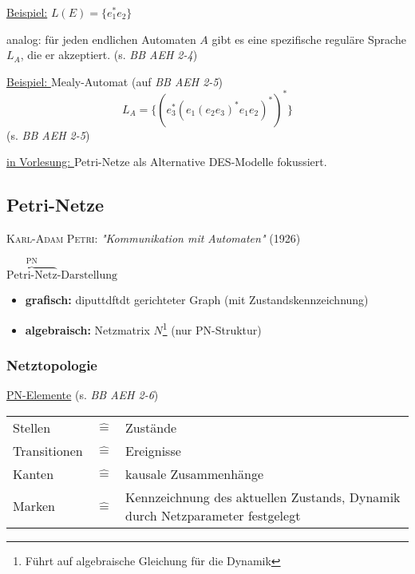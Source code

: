 \underline{Beispiel:} $L(E) = \{e_1^{\ast} e_2\}$


analog: für jeden endlichen Automaten $A$ gibt es eine spezifische reguläre Sprache $L_A$, die er akzeptiert. (s. \textit{BB AEH 2-4})

\underline{Beispiel: } Mealy-Automat (auf \textit{BB AEH 2-5})
\begin{equation}
	L_A = \{ (e_3^{\ast}(e_1 (e_2 e_3)^{\ast} e_1 e_2)^{\ast})^{\ast} \}
\end{equation}
(s. \textit{BB AEH 2-5})

\underline{in Vorlesung: } Petri-Netze als Alternative DES-Modelle fokussiert.





\subsection{Petri-Netze}
\textsc{Karl-Adam Petri}: \textit{"Kommunikation mit Automaten"} (1926)

\underline{$\overbrace{\text{Petri-Netz}}^{\text{PN}}\text{-Darstellung}$}

\begin{itemize}
	\item \textbf{grafisch:} diputtdftdt gerichteter Graph (mit Zustandskennzeichnung)
	\item \textbf{algebraisch:} Netzmatrix $N$\footnote{Führt auf algebraische Gleichung für die Dynamik} (nur PN-Struktur) 
\end{itemize}

\subsubsection{Netztopologie}

\underline{PN-Elemente} (s. \textit{BB AEH 2-6})

\begin{tabularx}{0.9\linewidth}{p{2.1cm}p{0.1cm}X}
	Stellen & $\mathrel{\hat{=}}$ & Zustände \\
	Transitionen & $\mathrel{\hat{=}}$ & Ereignisse \\
	Kanten & $\mathrel{\hat{=}}$ & kausale Zusammenhänge \\
	Marken & $\mathrel{\hat{=}}$ & Kennzeichnung des aktuellen Zustands, Dynamik durch Netzparameter festgelegt \\
\end{tabularx}

